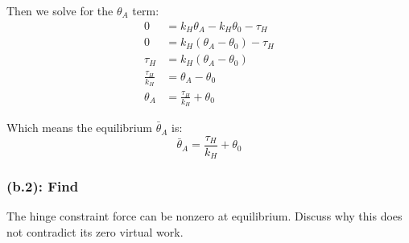 \documentclass[titlepage]{article}
\begin{document}
Then we solve for the $\theta_A$ term:
\begin{equation}
	\begin{split}
		0&=k_H\theta_A-k_H\theta_0-\tau_H \\
		0&=k_H(\theta_A-\theta_0)-\tau_H \\
		\tau_H&=k_H(\theta_A-\theta_0) \\
		\frac{\tau_H}{k_H}&=\theta_A-\theta_0 \\
		\theta_A&=\frac{\tau_H}{k_H}+\theta_0
	\end{split}
\end{equation}

\begin{mdframed}[linewidth=1pt, innertopmargin=10pt, innerbottommargin=10pt]
	Which means the equilibrium $\bar{\theta}_A$ is:
	\begin{equation}
		\bar{\theta}_A=\frac{\tau_H}{k_H}+\theta_0 
	\end{equation}
\end{mdframed}

\newpage

\subsubsection*{(b.2): Find}
The hinge constraint force can be nonzero at equilibrium. Discuss why this does not contradict its zero virtual work.\\
\end{document}
